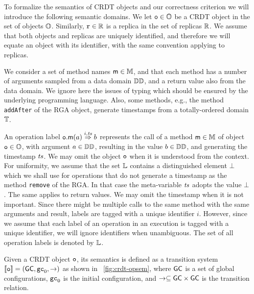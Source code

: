 To formalize the semantics of CRDT objects and our correctness
criterion we will introduce the following semantic domains.
%
We let $\mathtt{o} \in \mathbb{O}$ be a CRDT object in the set of objects
$\mathbb{O}$.
Similarly, $\mathtt{r} \in \mathbb{R}$ is a replica in the set of replicas
$\mathbb{R}$.
We assume that both objects and replicas are uniquely identified, and
therefore we will equate an object with its identifier, with the same
convention applying to replicas.

We consider a set of method names $\mathsf{m} \in \mathbb{M}$, and that each method has a
number of arguments sampled from a data domain $\mathbb{DD}$, and a
return value also from the data domain.
We ignore here the issues of typing which should be ensured by the
underlying programming language.
Also, some methods, e.g., the method {\tt addAfter} of the RGA object, generate timestamps from a
totally-ordered domain $\mathbb{T}$.


An operation label ${{\mathtt{o}.\mathsf{m}}}(a) \overset{i,\mathit{ts}}{\Rightarrow} b$ represents the
call of a method $\mathsf{m} \in \mathbb{M}$ of object $\mathtt{o}\in \mathbb{O}$,
with argument $a \in \mathbb{DD}$, resulting in the value $b
\in \mathbb{DD}$, and generating the timestamp $\mathit{ts}$.
We may omit the object $\mathtt{o}$ when it is understood from the context.
For uniformity, we assume that the set $\mathbb{L}$ contains a
distinguished element $\bot$ which we shall use for operations that do
not generate a timestamp as the method {\tt remove} of the RGA.
In that case the meta-variable $\mathit{ts}$ adopts the value $\bot$.
The same applies to return values.
We may omit the timestamp when it is not important.
Since there might be multiple calls to the same method with the same
arguments and result, labels are tagged with a unique identifier $i$.
However, since we assume that each label of an operation in an
execution is tagged with a unique identifier, we will ignore
identifiers when unambiguous.
The set of all operation labels is denoted by $\mathbb{L}$.

Given a CRDT object $\mathtt{o}$, its semantics is defined as a transition
system $\llbracket \mathtt{o} \rrbracket =
(\mathsf{GC},\mathtt{gc}_0,\rightarrow)$ as shown in
\figurename~\ref{fig:crdt-opsem}, where $\mathsf{GC}$ is a set of
global configurations, $\mathtt{gc}_0$ is the initial configuration,
and $\rightarrow\subseteq \mathsf{GC} \times \mathsf{GC}$ is the
transition relation.

